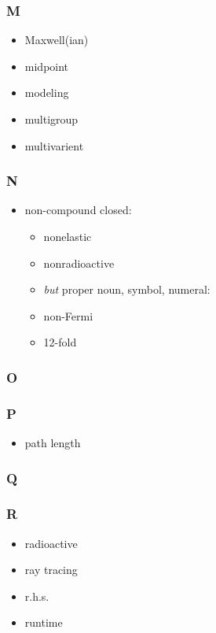 \documentclass[10pt, letter]{article}
\begin{document}
\begin{multicols}{2}
\subsubsection*{M}
\begin{itemize}
\item Maxwell(ian)
\item midpoint
\item modeling
\item multigroup
\item multivarient
\end{itemize}

\subsubsection*{N}
\begin{itemize}
\item non-compound closed:
  \begin{itemize}
  \item nonelastic
  \item nonradioactive
  \item \textit{but} proper noun, symbol, numeral:
  \item non-Fermi
  \item 12-fold
  \end{itemize}
\end{itemize}

\subsubsection*{O}
\subsubsection*{P}
\begin{itemize}
\item path length
\end{itemize}
\subsubsection*{Q}
\subsubsection*{R}
\begin{itemize}
\item radioactive
\item ray tracing
\item r.h.s.
\item runtime
\end{itemize}


\end{multicols}
\end{document}
